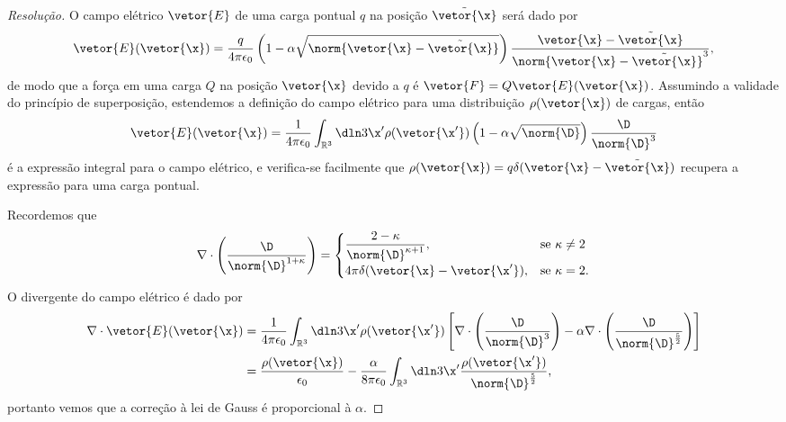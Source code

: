 \begin{proof}[Resolução]
    O campo elétrico \(\vetor{E}\) de uma carga pontual \(q\) na posição \(\tilde{\vetor{\x}}\) será dado por
    \begin{equation*}
        \vetor{E}(\vetor{\x}) = \frac{q}{4\pi \epsilon_0} \left(1 - \alpha\sqrt{\norm{\vetor{\x} - \tilde{\vetor{\x}}}}\right) \frac{\vetor{\x} - \tilde{\vetor{\x}}}{\norm{\vetor{\x} - \tilde{\vetor{\x}}}^3},
    \end{equation*}
    de modo que a força em uma carga \(Q\) na posição \(\vetor{\x}\) devido a \(q\) é \(\vetor{F} = Q \vetor{E}(\vetor{\x})\). Assumindo a validade do princípio de superposição, estendemos a definição do campo elétrico para uma distribuição \(\rho(\vetor{\x})\) de cargas, então
    \begin{equation*}
        \vetor{E}(\vetor{\x}) = \frac{1}{4\pi \epsilon_0} \int_{\mathbb{R}^3} \dln3{\x'}\rho(\vetor{\x'})\left(1 - \alpha\sqrt{\norm{\D}} \right)\frac{\D}{\norm{\D}^3}
    \end{equation*}
    é a expressão integral para o campo elétrico, e verifica-se facilmente que \(\rho(\vetor{\x}) = q \delta(\vetor{\x} - \tilde{\vetor{\x}})\) recupera a expressão para uma carga pontual.

    Recordemos que
    \begin{equation*}
        \nabla \cdot \left(\frac{\D}{\norm{\D}^{1+\kappa}}\right) = \begin{cases}
            \dfrac{2 - \kappa}{\norm{\D}^{\kappa + 1}},& \text{se }\kappa \neq 2\\
            4\pi \delta(\vetor{\x} - \vetor{\x'}),& \text{se }\kappa = 2.
        \end{cases}
    \end{equation*}
    O divergente do campo elétrico é dado por
    \begin{align*}
        \nabla \cdot \vetor{E}(\vetor{\x}) &= \frac{1}{4\pi \epsilon_0} \int_{\mathbb{R}^3} \dln3{\x'} \rho(\vetor{\x'}) \left[\nabla\cdot\left(\frac{\D}{\norm{\D}^3}\right) - \alpha \nabla\cdot\left(\frac{\D}{\norm{\D}^{\frac52}}\right)\right]\\
                                           &= \frac{\rho(\vetor{\x})}{\epsilon_0} - \frac{\alpha}{8\pi \epsilon_0} \int_{\mathbb{R}^3}\dln3{\x'} \frac{\rho(\vetor{\x'})}{\norm{\D}^{\frac52}},
    \end{align*}
    portanto vemos que a correção à lei de Gauss é proporcional à \(\alpha\).


\end{proof}
